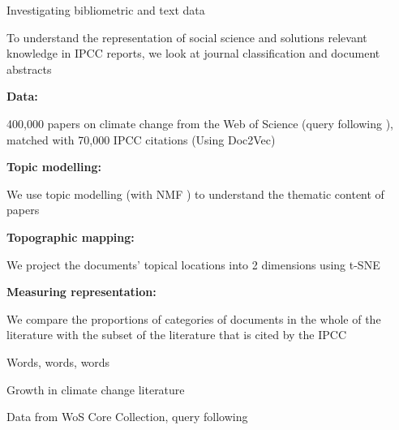 \documentclass[9pt, aspectratio=169]{beamer}
\begin{document}
\begin{frame}{Investigating bibliometric and text data}

To understand the representation of social science and solutions relevant knowledge in IPCC reports, we look at journal classification and document abstracts

\bigskip

\textbf{Data:}

400,000 papers on climate change from the Web of Science (query following \cite{Grieneisen2011}), matched with 70,000 IPCC citations (Using Doc2Vec)

\bigskip

\textbf{Topic modelling:}

We use topic modelling (with NMF \citep{Lee1999}) to understand the thematic content of papers

\bigskip

\textbf{Topographic mapping:}

We project the documents' topical locations into 2 dimensions using t-SNE \citep{vandermaaten2008} 

\bigskip

\textbf{Measuring representation:}

We compare the proportions of categories of documents in the whole of the literature with the subset of the literature that is cited by the IPCC

\end{frame}


\begin{frame}{Words, words, words}

\begin{table}[h]
	\begin{adjustbox}{width=0.8\linewidth}
		
	\end{adjustbox}			
	\caption{Growth in climate change literature}
	\label{growthtable}
\end{table}	

%			

Data from WoS Core Collection, query following \citet{Grieneisen2011}

\end{frame}
\end{document}
